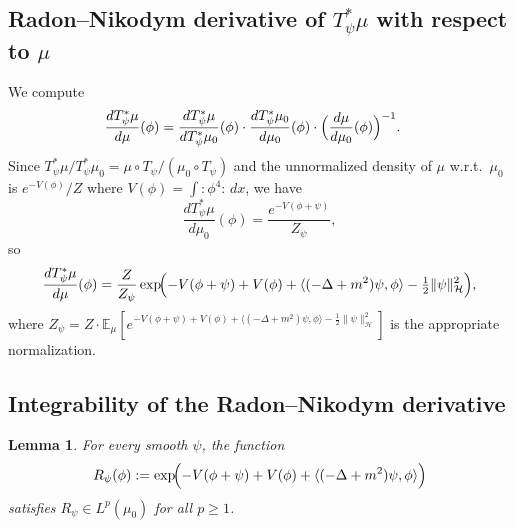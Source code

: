 \documentclass[12pt]{article}
\newtheorem{lemma}[theorem]{Lemma}
\begin{document}
\subsection*{Radon--Nikodym derivative of $T_\psi^*\mu$ with respect to $\mu$}

We compute
\begin{align*}
  \frac{dT_\psi^*\mu}{d\mu}(\phi)
  &= \frac{d T_\psi^*\mu}{d T_\psi^*\mu_0}(\phi)
     \cdot \frac{d T_\psi^*\mu_0}{d\mu_0}(\phi)
     \cdot \Bigl(\frac{d\mu}{d\mu_0}(\phi)\Bigr)^{-1}.
\end{align*}
Since $T_\psi^*\mu/T_\psi^*\mu_0 = \mu\circ T_\psi / (\mu_0\circ T_\psi)$ and the unnormalized density of $\mu$ w.r.t.\ $\mu_0$ is $e^{-V(\phi)}/Z$ where $V(\phi) = \int:\!\phi^4\!:\,dx$, we have
\[
  \frac{dT_\psi^*\mu}{d\mu_0}(\phi)
  = \frac{e^{-V(\phi+\psi)}}{Z_\psi},
\]
so
\[
  \frac{dT_\psi^*\mu}{d\mu}(\phi)
  = \frac{Z}{Z_\psi}\exp\!\Bigl(-V(\phi+\psi)+V(\phi)
    + \langle(-\Delta+m^2)\psi,\phi\rangle - \tfrac12\|\psi\|_{\mathcal{H}}^2\Bigr),
\]
where $Z_\psi = Z\cdot\mathbb{E}_\mu[e^{-V(\phi+\psi)+V(\phi)+\langle(-\Delta+m^2)\psi,\phi\rangle-\frac12\|\psi\|_{\mathcal{H}}^2}]$ is the appropriate normalization.

\subsection*{Integrability of the Radon--Nikodym derivative}

\begin{lemma}
  \label{lem:exp-integrability}
  For every smooth $\psi$, the function
  \[
    R_\psi(\phi) := \exp\!\Bigl(-V(\phi+\psi)+V(\phi)
      +\langle(-\Delta+m^2)\psi,\phi\rangle\Bigr)
  \]
  satisfies $R_\psi \in L^p(\mu_0)$ for all $p \geq 1$.
\end{lemma}
\end{document}
